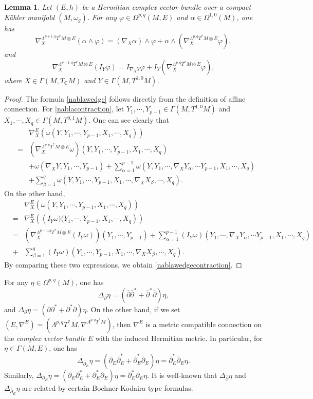 \documentclass[12pt, reqno]{amsart}
\newcommand\bp{{\bar\partial}}
\theoremstyle{plain}
\newtheorem{lemma}[thm]{Lemma}
\theoremstyle{definition}
\newcommand{\bproof}{\begin{proof}}
\newcommand{\eproof}{\end{proof}}
\newcommand{\elemma}{\end{lemma}}
\newcommand{\blemma}{\begin{lemma}}
\newcommand{\p}{\partial}
\renewcommand{\bar}{\overline}
\renewcommand{\phi}{\varphi}
\newcommand{\beq}{\begin{equation}}
\newcommand{\eeq}{\end{equation}}
\newcommand{\ee}{\end{eqnarray*}}
\newcommand{\be}{\begin{eqnarray*}}
\renewcommand{\bp}{\bar{\partial}}
\newcommand{\Om}{\Omega}
\renewcommand{\>}{\rightarrow}
\newcommand{\C}{{\mathbb C}}
\renewcommand{\#}{\sharp}
\numberwithin{equation}{section} %
\begin{document}
\blemma
\label{nablawedgecontraction} Let $(E,h)$ be a Hermitian complex vector bundle over a compact K\"ahler manifold $(M,\omega_g)$.
For any $ \phi \in \Omega^{p,q}(M,E) $ and $ \alpha \in \Omega^{1,0}(M) $, one has
\beq \label{nablawedge} \nabla^{\Lambda^{p+1,q} T^*M \otimes E}_X(\alpha \wedge \phi) =\left( \nabla_X\alpha\right) \wedge \phi + \alpha \wedge \left(\nabla^{\Lambda^{p,q} T^*M \otimes E}_X\phi\right), \eeq
and
\beq\nabla^{\Lambda^{p-1,q} T^*M \otimes E}_X \left(I_Y \phi\right) = I_{\nabla_X Y} \phi + I_Y \left(\nabla^{\Lambda^{p,q} T^*M \otimes E}_X \phi\right),  \label{nablacontraction}\eeq
where  $ X \in \Gamma(M,T_\C M) $ and $ Y \in \Gamma(M,T^{1,0}M) $.
\elemma

\bproof The formula \eqref{nablawedge} follows directly from the definition of affine connection.  For  \eqref{nablacontraction},
let $ Y_1, \cdots, Y_{p-1} \in \Gamma(M,T^{1,0}M) $ and $ X_1, \cdots, X_q \in \Gamma(M,T^{0,1}M) $.  One can see clearly that
\be && \nabla^E_X \left(\omega(Y,Y_1, \cdots, Y_{p-1},X_1, \cdots, X_q)\right) \\
& = & \left(\nabla^{\Lambda^{p,q} T^*M \otimes E}_X \omega\right)\left(Y,Y_1, \cdots, Y_{p-1},X_1, \cdots, X_q\right) \\&&+ \omega\left(\nabla_X Y,Y_1, \cdots, Y_{p-1}\right)  +  \sum_{\alpha = 1}^{p-1} \omega(Y,Y_1, \cdots, \nabla_X Y_\alpha ,\cdots Y_{p-1},X_1, \cdots, X_q)\\&& + \sum_{\beta = 1}^q \omega\left(Y,Y_1, \cdots, Y_{p-1},X_1, \cdots, \nabla_X X_\beta, \cdots, X_q\right) .\ee
On the other hand,
\be && \nabla^E_X \left(\omega\left(Y,Y_1, \cdots, Y_{p-1},X_1, \cdots, X_q\right)\right)\\
&=& \nabla^E_X \left(\left(I_Y\omega)(Y_1, \cdots, Y_{p-1},X_1, \cdots, X_q\right)\right) \\
& = &\left(\nabla^{\Lambda^{p-1,q} T^*M \otimes E}_X\left( I_Y\omega\right)\right)\left(Y_1, \cdots, Y_{p-1}\right) + \sum_{\alpha = 1}^{p-1}\left(I_Y\omega\right)\left(Y_1, \cdots, \nabla_X Y_\alpha ,\cdots Y_{p-1},X_1, \cdots, X_q\right) \\
& + &\sum_{\beta = 1}^q \left(I_Y\omega\right)\left(Y_1, \cdots, Y_{p-1},X_1, \cdots, \nabla_X X_\beta, \cdots, X_q\right) .\ee
By comparing these two expressions, we obtain \eqref{nablawedgecontraction}.
\eproof






  For any $\eta\in \Om^{p,q}(M)$, one has
  \beq \Delta_{\bp} \eta=\left(\bp\bp^*+\bp^*\bp\right)\eta,  \eeq
  and $\Delta_{\p} \eta=\left(\p\p^*+\p^*\p\right)\eta.$
On the other hand, if we set $(E,\nabla^E)=\left(\Lambda^{p,q}T^*M,\nabla^{\Lambda^{p,q}T^*M}\right)$, then $\nabla^E$ is a metric compatible connection on the  \emph{complex vector bundle} $E$ with the induced Hermitian metric. In particular, for $\eta\in \Gamma(M,E)$, one has
\beq \Delta_{\bp_E} \eta=\left(\bp_E\bp_E^*+\bp^*_E\bp_E\right)\eta= \bp^*_E\bp_E \eta.\eeq
Similarly, $\Delta_{\p_E}\eta=\left(\p_E\p_E^*+\p^*_E\p_E\right)\eta= \p^*_E\p_E \eta$.
It is well-known that $ \Delta_{\bp} \eta$ and $\Delta_{\bp_E} \eta$ are related by certain Bochner-Kodaira type formulas. \\
\end{document}
